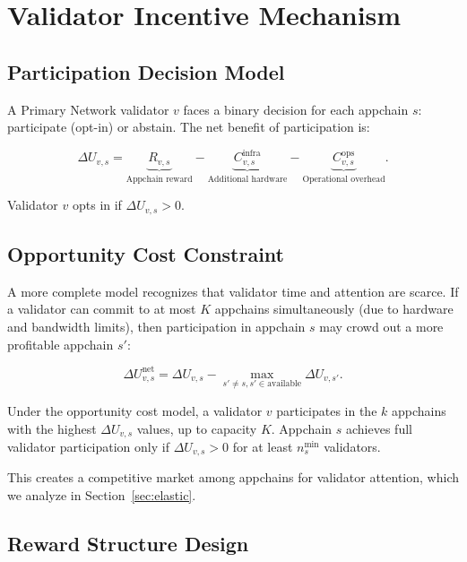 \section{Validator Incentive Mechanism}

\label{sec:validators}

\subsection{Participation Decision Model}

A Primary Network validator $v$ faces a binary decision for each appchain $s$:
participate (opt-in) or abstain. The net benefit of participation is:

\[
  \Delta U_{v,s} = \underbrace{R_{v,s}}_{\text{Appchain reward}} - \underbrace{C_{v,s}^{\text{infra}}}_{\text{Additional hardware}} - \underbrace{C_{v,s}^{\text{ops}}}_{\text{Operational overhead}}.
\]

Validator $v$ opts in if $\Delta U_{v,s} > 0$.

\subsection{Opportunity Cost Constraint}

A more complete model recognizes that validator time and attention are scarce. If a
validator can commit to at most $K$ appchains simultaneously (due to hardware and bandwidth
limits), then participation in appchain $s$ may crowd out a more profitable appchain $s'$:

\[
  \Delta U_{v,s}^{\text{net}} = \Delta U_{v,s} - \max_{s' \neq s, s' \in \text{available}} \Delta U_{v,s'}.
\]

\begin{proposition}
Under the opportunity cost model, a validator $v$ participates in the $k$ appchains with
the highest $\Delta U_{v,s}$ values, up to capacity $K$. Appchain $s$ achieves full validator
participation only if $\Delta U_{v,s} > 0$ for at least $n_s^{\min}$ validators.
\end{proposition}

This creates a competitive market among appchains for validator attention, which we analyze
in Section~\ref{sec:elastic}.

\subsection{Reward Structure Design}

